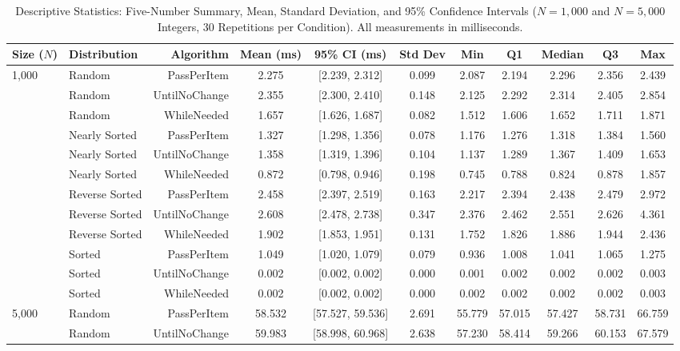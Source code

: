 \begin{table}[t]
\centering
\caption{Descriptive Statistics: Five-Number Summary, Mean, Standard Deviation, and 95\% Confidence Intervals ($N=1,000$ and $N=5,000$ Integers, 30 Repetitions per Condition). All measurements in milliseconds.}
\label{tab:descriptive_stats}
\small
\begin{tabular}{llrcccccccc}
\toprule
\textbf{Size ($N$)} & \textbf{Distribution} & \textbf{Algorithm} & \textbf{Mean (ms)} & \textbf{95\% CI (ms)} & \textbf{Std Dev} & \textbf{Min} & \textbf{Q1} & \textbf{Median} & \textbf{Q3} & \textbf{Max} \\
\midrule
1,000 & Random & PassPerItem & 2.275 & [2.239, 2.312] & 0.099 & 2.087 & 2.194 & 2.296 & 2.356 & 2.439 \\
 & Random & UntilNoChange & 2.355 & [2.300, 2.410] & 0.148 & 2.125 & 2.292 & 2.314 & 2.405 & 2.854 \\
 & Random & WhileNeeded & 1.657 & [1.626, 1.687] & 0.082 & 1.512 & 1.606 & 1.652 & 1.711 & 1.871 \\
 & Nearly Sorted & PassPerItem & 1.327 & [1.298, 1.356] & 0.078 & 1.176 & 1.276 & 1.318 & 1.384 & 1.560 \\
 & Nearly Sorted & UntilNoChange & 1.358 & [1.319, 1.396] & 0.104 & 1.137 & 1.289 & 1.367 & 1.409 & 1.653 \\
 & Nearly Sorted & WhileNeeded & 0.872 & [0.798, 0.946] & 0.198 & 0.745 & 0.788 & 0.824 & 0.878 & 1.857 \\
 & Reverse Sorted & PassPerItem & 2.458 & [2.397, 2.519] & 0.163 & 2.217 & 2.394 & 2.438 & 2.479 & 2.972 \\
 & Reverse Sorted & UntilNoChange & 2.608 & [2.478, 2.738] & 0.347 & 2.376 & 2.462 & 2.551 & 2.626 & 4.361 \\
 & Reverse Sorted & WhileNeeded & 1.902 & [1.853, 1.951] & 0.131 & 1.752 & 1.826 & 1.886 & 1.944 & 2.436 \\
 & Sorted & PassPerItem & 1.049 & [1.020, 1.079] & 0.079 & 0.936 & 1.008 & 1.041 & 1.065 & 1.275 \\
 & Sorted & UntilNoChange & 0.002 & [0.002, 0.002] & 0.000 & 0.001 & 0.002 & 0.002 & 0.002 & 0.003 \\
 & Sorted & WhileNeeded & 0.002 & [0.002, 0.002] & 0.000 & 0.002 & 0.002 & 0.002 & 0.002 & 0.003 \\
\midrule
5,000 & Random & PassPerItem & 58.532 & [57.527, 59.536] & 2.691 & 55.779 & 57.015 & 57.427 & 58.731 & 66.759 \\
 & Random & UntilNoChange & 59.983 & [58.998, 60.968] & 2.638 & 57.230 & 58.414 & 59.266 & 60.153 & 67.579 \\

\end{tabular}
\end{table}
